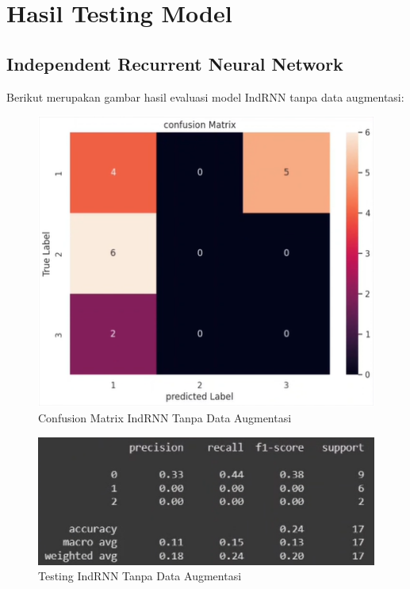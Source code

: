 \section{Hasil Testing Model}
\subsection{Independent Recurrent Neural Network}

Berikut merupakan gambar hasil evaluasi model IndRNN tanpa data augmentasi:
\newpage
\begin{figure} [H] \centering
  \includegraphics[scale=1.3]{gambar/CMIndRNNnoaug2.png}
  \caption{Confusion Matrix IndRNN Tanpa Data Augmentasi}
  \label{fig:CMIndRNNnoaug2}
\end{figure}

\begin{figure} [H] \centering
  \includegraphics[scale=1]{gambar/scoreIndRNNnoaug2.png}
  \caption{Testing IndRNN Tanpa Data Augmentasi}
  \label{fig:ScoreIndRNNnoaug2}
\end{figure}

